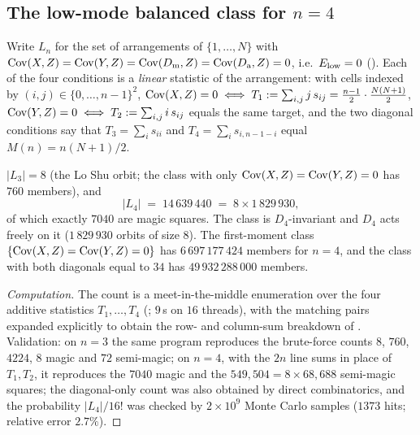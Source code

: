 
\subsection{The low-mode balanced class for $n=4$}
\label{sec:lowmode_n4}

Write $L_n$ for the set of arrangements of $\{1,\dots,N\}$ with
$\mathrm{Cov}(X,Z)=\mathrm{Cov}(Y,Z)=\mathrm{Cov}(D_{\mathrm{m}},Z)=\mathrm{Cov}(D_{\mathrm{a}},Z)=0$,
i.e.\ $E_{\mathrm{low}}=0$ ().  Each of the four conditions is a \emph{linear} statistic of the
arrangement: with cells indexed by $(i,j)\in\{0,\dots,n-1\}^2$,
$\mathrm{Cov}(X,Z)=0 \iff T_1:=\sum_{i,j} j\,s_{ij} = \tfrac{n-1}{2}\cdot\tfrac{N(N+1)}{2}$,
$\mathrm{Cov}(Y,Z)=0 \iff T_2:=\sum_{i,j} i\,s_{ij}$ equals the same target, and the two diagonal
conditions say that $T_3=\sum_i s_{ii}$ and $T_4=\sum_i s_{i,n-1-i}$ equal $M(n)=n(N+1)/2$.

\begin{proposition}
\label{prop:L4}
$|L_3| = 8$ (the Lo Shu orbit; the class with only $\mathrm{Cov}(X,Z)=\mathrm{Cov}(Y,Z)=0$ has $760$ members), and
\[
  |L_4| \;=\; 14\,639\,440 \;=\; 8\times 1\,829\,930 ,
\]
of which exactly $7040$ are magic squares.  The class is $D_4$-invariant and $D_4$ acts freely on it
($1\,829\,930$ orbits of size $8$).  The first-moment class
$\{\mathrm{Cov}(X,Z)=\mathrm{Cov}(Y,Z)=0\}$ has $6\,697\,177\,424$ members for $n=4$,
and the class with both diagonals equal to $34$ has $49\,932\,288\,000$ members.
\end{proposition}

\begin{proof}[Computation]
The count is a meet-in-the-middle enumeration over the four additive statistics $T_1,\dots,T_4$ (; $9$\,s on
$16$ threads), with the matching pairs expanded explicitly to obtain the row- and column-sum breakdown of .
Validation: on $n=3$ the same program reproduces the brute-force counts $8$, $760$, $4224$, $8$ magic and $72$ semi-magic; on
$n=4$, with the $2n$ line sums in place of $T_1,T_2$, it reproduces the $7040$ magic and the $549{,}504=8\times68{,}688$
semi-magic squares; the diagonal-only count was also obtained by direct combinatorics, and the probability $|L_4|/16!$ was
checked by $2\times10^{9}$ Monte Carlo samples ($1373$ hits; relative error $2.7\%$).
\end{proof}


